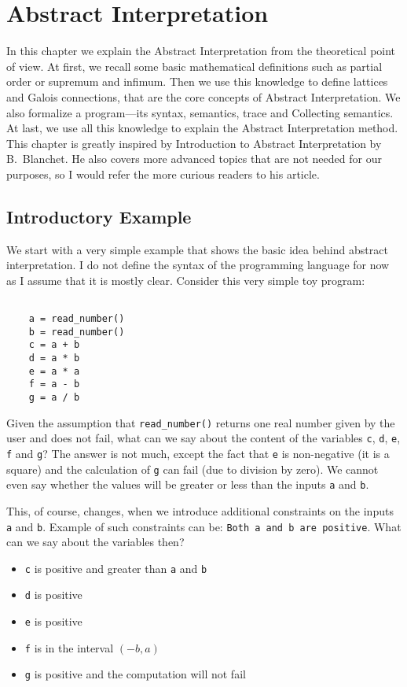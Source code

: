 \chapter{Abstract Interpretation}

In this chapter we explain the Abstract Interpretation from the theoretical point of view.
At first, we recall some basic mathematical definitions such as partial order or supremum and infimum.
Then we use this knowledge to define lattices and Galois connections, that are the core concepts of Abstract
Interpretation.
We also formalize a program---its syntax, semantics, trace and Collecting semantics.
At last, we use all this knowledge to explain the Abstract Interpretation method.
This chapter is greatly inspired by Introduction to Abstract Interpretation by B.~Blanchet\cite{Blanchet:2002:AI}.
He also covers more advanced topics that are not needed for our purposes, so I would refer the more curious readers
to his article.


\section{Introductory Example} %

We start with a very simple example that shows the basic idea behind abstract interpretation.
I do not define the syntax of the programming language for now as I assume that it is mostly clear.
Consider this very simple toy program:

\begin{verbatim}

    a = read_number()
    b = read_number()
    c = a + b
    d = a * b
    e = a * a
    f = a - b
    g = a / b

\end{verbatim}

Given the assumption that \verb|read_number()| returns one real number given by the user and does not fail, what can
we say about the content of the variables \verb|c|, \verb|d|, \verb|e|, \verb|f| and \verb|g|?
The answer is not much, except the fact that \verb|e| is non-negative (it is a square) and the calculation of \verb|g|
can fail (due to division by zero).
We cannot even say whether the values will be greater or less than the inputs \verb|a| and \verb|b|.

This, of course, changes, when we introduce additional constraints on the inputs \verb|a| and \verb|b|.
Example of such constraints can be: \verb|Both a and b are positive|.
What can we say about the variables then?
\begin{itemize}
    \item \verb|c| is positive and greater than \verb|a| and \verb|b|
    \item \verb|d| is positive
    \item \verb|e| is positive
    \item \verb|f| is in the interval $(-b, a)$
    \item \verb|g| is positive and the computation will not fail
\end{itemize}


